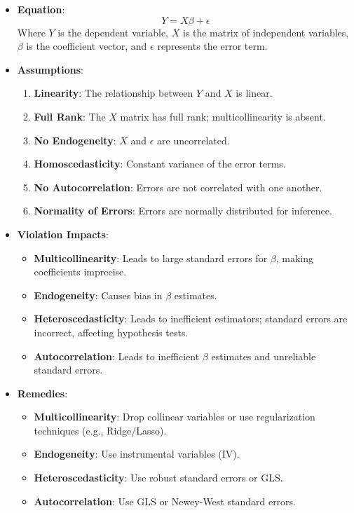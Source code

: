 \documentclass[
]{article}
\providecommand{\tightlist}{%
  \setlength{\itemsep}{0pt}\setlength{\parskip}{0pt}}\usepackage{longtable,booktabs,array}
\begin{document}
\begin{itemize}
\tightlist
\item
  \textbf{Equation}: \[Y = X\beta + \epsilon\] Where \(Y\) is the
  dependent variable, \(X\) is the matrix of independent variables,
  \(\beta\) is the coefficient vector, and \(\epsilon\) represents the
  error term.
\item
  \textbf{Assumptions}:

  \begin{enumerate}
  \def\labelenumi{\arabic{enumi}.}
  \tightlist
  \item
    \textbf{Linearity}: The relationship between \(Y\) and \(X\) is
    linear.
  \item
    \textbf{Full Rank}: The \(X\) matrix has full rank;
    multicollinearity is absent.
  \item
    \textbf{No Endogeneity}: \(X\) and \(\epsilon\) are uncorrelated.
  \item
    \textbf{Homoscedasticity}: Constant variance of the error terms.
  \item
    \textbf{No Autocorrelation}: Errors are not correlated with one
    another.
  \item
    \textbf{Normality of Errors}: Errors are normally distributed for
    inference.
  \end{enumerate}
\item
  \textbf{Violation Impacts}:

  \begin{itemize}
  \tightlist
  \item
    \textbf{Multicollinearity}: Leads to large standard errors for
    \(\beta\), making coefficients imprecise.
  \item
    \textbf{Endogeneity}: Causes bias in \(\beta\) estimates.
  \item
    \textbf{Heteroscedasticity}: Leads to inefficient estimators;
    standard errors are incorrect, affecting hypothesis tests.
  \item
    \textbf{Autocorrelation}: Leads to inefficient \(\beta\) estimates
    and unreliable standard errors.
  \end{itemize}
\item
  \textbf{Remedies}:

  \begin{itemize}
  \tightlist
  \item
    \textbf{Multicollinearity}: Drop collinear variables or use
    regularization techniques (e.g., Ridge/Lasso).
  \item
    \textbf{Endogeneity}: Use instrumental variables (IV).
  \item
    \textbf{Heteroscedasticity}: Use robust standard errors or GLS.
  \item
    \textbf{Autocorrelation}: Use GLS or Newey-West standard errors.
  \end{itemize}
\end{itemize}
\end{document}
